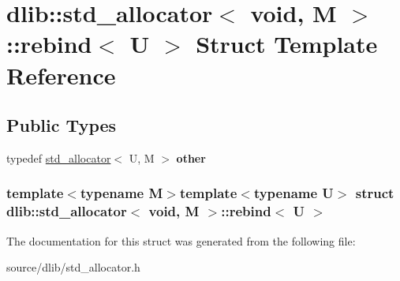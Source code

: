\hypertarget{structdlib_1_1std__allocator_3_01void_00_01M_01_4_1_1rebind}{
\section{dlib::std\_\-allocator$<$ void, M $>$::rebind$<$ U $>$ Struct Template Reference}
\label{structdlib_1_1std__allocator_3_01void_00_01M_01_4_1_1rebind}
}
\subsection*{Public Types}
\begin{DoxyCompactItemize}
\item 
\hypertarget{structdlib_1_1std__allocator_3_01void_00_01M_01_4_1_1rebind_a01b39f090eda7273c058b0b1b9bb945d}{
typedef \hyperlink{classdlib_1_1std__allocator}{std\_\-allocator}$<$ U, M $>$ {\bfseries other}}
\label{structdlib_1_1std__allocator_3_01void_00_01M_01_4_1_1rebind_a01b39f090eda7273c058b0b1b9bb945d}

\end{DoxyCompactItemize}
\subsubsection*{template$<$typename M$>$template$<$typename U$>$ struct dlib::std\_\-allocator$<$ void, M $>$::rebind$<$ U $>$}



The documentation for this struct was generated from the following file:\begin{DoxyCompactItemize}
\item 
source/dlib/std\_\-allocator.h\end{DoxyCompactItemize}
